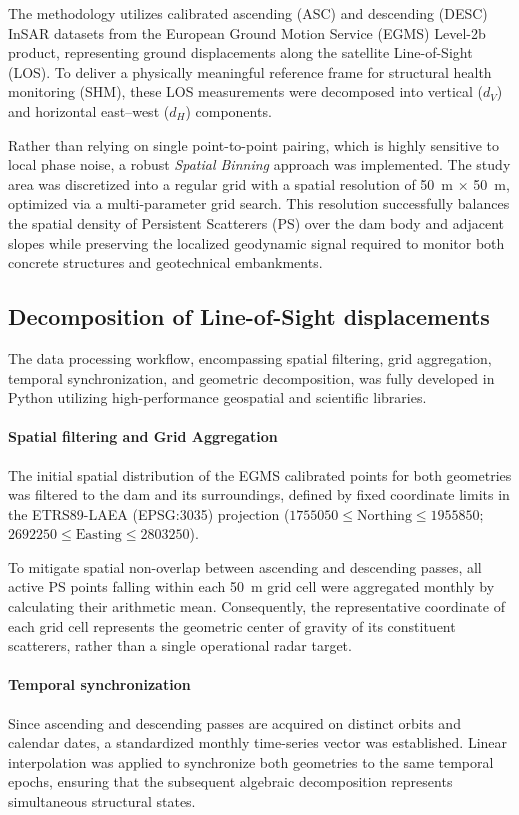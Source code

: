 \documentclass[11pt,a4paper]{article}
\begin{document}
The methodology utilizes calibrated ascending (ASC) and descending (DESC) InSAR datasets from the European Ground Motion Service (EGMS) Level-2b product, representing ground displacements along the satellite Line-of-Sight (LOS). To deliver a physically meaningful reference frame for structural health monitoring (SHM), these LOS measurements were decomposed into vertical ($d_V$) and horizontal east--west ($d_H$) components. 

Rather than relying on single point-to-point pairing, which is highly sensitive to local phase noise, a robust \textit{Spatial Binning} approach was implemented. The study area was discretized into a regular grid with a spatial resolution of 50~m $\times$ 50~m, optimized via a multi-parameter grid search. This resolution successfully balances the spatial density of Persistent Scatterers (PS) over the dam body and adjacent slopes while preserving the localized geodynamic signal required to monitor both concrete structures and geotechnical embankments.

\subsection{Decomposition of Line-of-Sight displacements}

The data processing workflow, encompassing spatial filtering, grid aggregation, temporal synchronization, and geometric decomposition, was fully developed in Python utilizing high-performance geospatial and scientific libraries.

\paragraph{Spatial filtering and Grid Aggregation}
The initial spatial distribution of the EGMS calibrated points for both geometries was filtered to the dam and its surroundings, defined by fixed coordinate limits in the ETRS89-LAEA (EPSG:3035) projection ($1755050 \le \text{Northing} \le 1955850$; $2692250 \le \text{Easting} \le 2803250$). 

To mitigate spatial non-overlap between ascending and descending passes, all active PS points falling within each 50~m grid cell were aggregated monthly by calculating their arithmetic mean. Consequently, the representative coordinate of each grid cell represents the geometric center of gravity of its constituent scatterers, rather than a single operational radar target.

\paragraph{Temporal synchronization}
Since ascending and descending passes are acquired on distinct orbits and calendar dates, a standardized monthly time-series vector was established. Linear interpolation was applied to synchronize both geometries to the same temporal epochs, ensuring that the subsequent algebraic decomposition represents simultaneous structural states.
\end{document}
